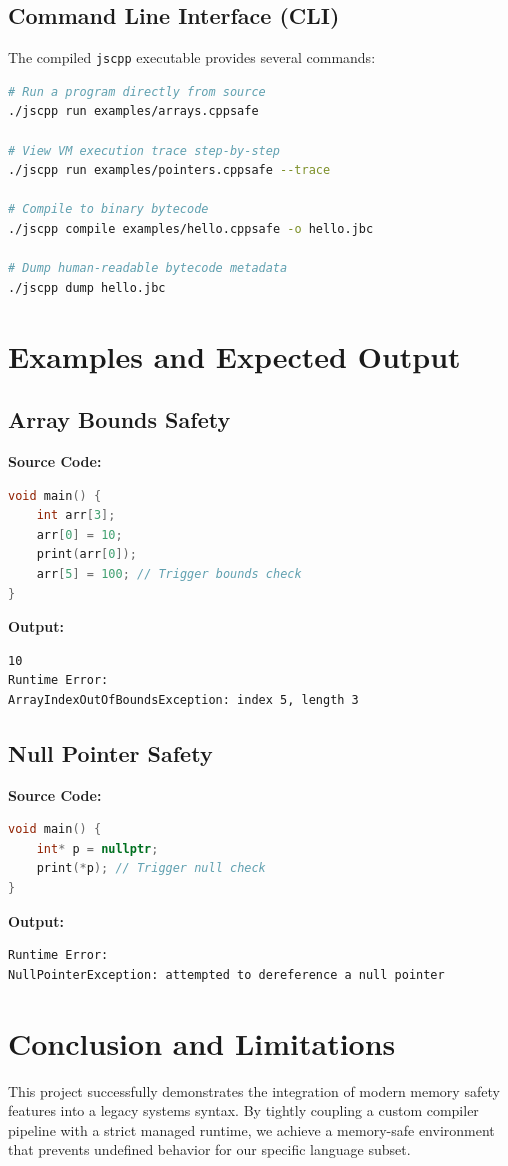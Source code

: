 \documentclass[12pt, a4paper]{article}
\begin{document}
\subsection{Command Line Interface (CLI)}
The compiled \texttt{jscpp} executable provides several commands:
\begin{lstlisting}[language=bash]
# Run a program directly from source
./jscpp run examples/arrays.cppsafe

# View VM execution trace step-by-step
./jscpp run examples/pointers.cppsafe --trace

# Compile to binary bytecode
./jscpp compile examples/hello.cppsafe -o hello.jbc

# Dump human-readable bytecode metadata
./jscpp dump hello.jbc
\end{lstlisting}

\section{Examples and Expected Output}

\subsection{Array Bounds Safety}
\textbf{Source Code:}
\begin{lstlisting}[language=C++]
void main() {
    int arr[3];
    arr[0] = 10;
    print(arr[0]);
    arr[5] = 100; // Trigger bounds check
}
\end{lstlisting}
\textbf{Output:}
\begin{lstlisting}
10
Runtime Error:
ArrayIndexOutOfBoundsException: index 5, length 3
\end{lstlisting}

\subsection{Null Pointer Safety}
\textbf{Source Code:}
\begin{lstlisting}[language=C++]
void main() {
    int* p = nullptr;
    print(*p); // Trigger null check
}
\end{lstlisting}
\textbf{Output:}
\begin{lstlisting}
Runtime Error:
NullPointerException: attempted to dereference a null pointer
\end{lstlisting}

\section{Conclusion and Limitations}
This project successfully demonstrates the integration of modern memory safety features into a legacy systems syntax. By tightly coupling a custom compiler pipeline with a strict managed runtime, we achieve a memory-safe environment that prevents undefined behavior for our specific language subset.
\end{document}
